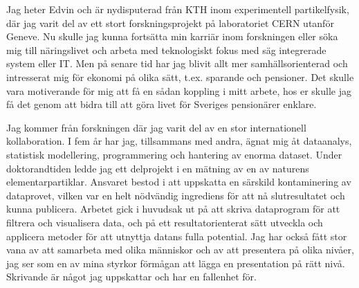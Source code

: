 \documentclass[11pt, a4paper]{../awesome-cv} %
\begin{document}
\makecvheader %

\makelettertitle %


\begin{cvletter}
\vspace{.6cm}

Jag heter Edvin och är nydisputerad från KTH inom experimentell partikelfysik, där jag varit del av ett stort forskningsprojekt på laboratoriet CERN utanför Geneve.
Nu skulle jag kunna fortsätta min karriär inom forskningen eller söka mig till näringslivet och arbeta med teknologiskt fokus med säg integrerade system eller IT. %
Men på senare tid har jag blivit allt mer samhällsorienterad och intresserat mig för ekonomi på olika sätt, t.ex. sparande och pensioner. %
Det skulle vara motiverande för mig att få en sådan koppling i mitt arbete, hos er skulle jag få det genom att bidra till att göra livet för Sveriges pensionärer enklare.

Jag kommer från forskningen där jag varit del av en stor internationell kollaboration. 
I fem år har jag, tillsammans med andra, ägnat mig åt dataanalys, statistisk modellering, programmering och hantering av enorma dataset.
Under doktorandtiden ledde jag ett delprojekt i en mätning av en av naturens elementarpartiklar.
Ansvaret bestod i att uppskatta en särskild kontaminering av dataprovet, vilken var en helt nödvändig ingrediens för att nå slutresultatet och kunna publicera.
Arbetet gick i huvudsak ut på att skriva dataprogram för att filtrera och visualisera data, och på ett resultatorienterat sätt utveckla och applicera metoder för att utnyttja datans fulla potential.
Jag har också fått stor vana av att samarbeta med olika människor och av att presentera på olika nivåer, jag ser som en av mina styrkor förmågan att lägga en presentation på rätt nivå. %
 Skrivande är något jag uppskattar och har en fallenhet för. 


\end{cvletter}
\end{document}
